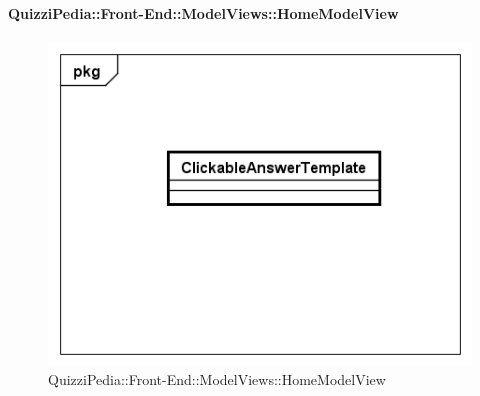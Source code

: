 	\paragraph{QuizziPedia::Front-End::ModelViews::HomeModelView}
	
	\label{QuizziPedia::Front-End::ModelViews::HomeModelView}
	
	\begin{figure}[ht]
		\centering
		\includegraphics[scale=0.5,keepaspectratio]{UML/Classi/Front-End/QuizziPedia_Front-end_Templates_ClickableAnswerTemplate.png}
		\caption{QuizziPedia::Front-End::ModelViews::HomeModelView}
	\end{figure} \FloatBarrier
	
